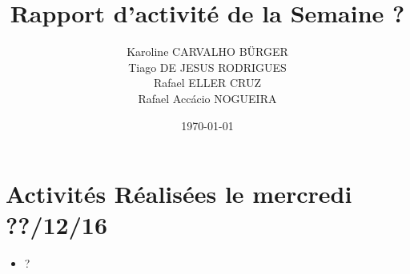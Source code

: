 \documentclass[11pt,a4paper,onecolumn]{articlewithlogo}
\title{Rapport d'activité de la Semaine ?}
\author{Karoline CARVALHO BÜRGER\\ Tiago DE JESUS RODRIGUES\\  Rafael ELLER CRUZ \\Rafael Accácio NOGUEIRA }
\date{\today}
\begin{document}
\maketitle
\section{Activités Réalisées le mercredi ??/12/16  }
\begin{itemize}
	\renewcommand\labelitemi{$\circ$}
	\item ?
\end{itemize}


%
\end{document}
